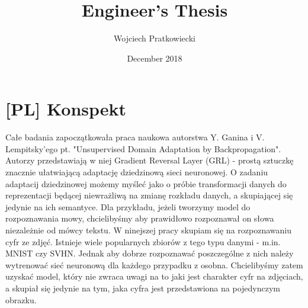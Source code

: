 \documentclass{article}
\title{Engineer's Thesis}
\author{Wojciech Pratkowiecki}
\date{December 2018}
\begin{document}
\maketitle

\section{[PL] Konspekt}
\par
Całe badania zapoczątkowała praca naukowa autorstwa Y. Ganina i V. Lempitsky'ego pt. "Unsupervised Domain Adaptation by Backpropagation". Autorzy przedstawiają w niej Gradient Reversal Layer (GRL) - prostą sztuczkę znacznie ułatwiającą adaptację dziedzinową sieci neuronowej. O zadaniu adaptacij dziedzinowej możemy myśleć jako o próbie transformacji danych do reprezentacji będącej niewrażliwą na zmianę rozkładu danych, a skupiającej się jedynie na ich semantyce. Dla przykładu, jeżeli tworzymy model do rozpoznawania mowy, chcielibyśmy aby prawidłowo rozpoznawał on słowa niezależnie od mówcy tekstu. W ninejszej pracy skupiam się na rozpoznawaniu cyfr ze zdjęć. Istnieje wiele popularnych zbiorów z tego typu danymi - m.in. MNIST czy SVHN. Jednak aby dobrze rozpoznawać poszczególne z nich należy wytrenować sieć neuronową dla każdego przypadku z osobna. Chcielibyśmy zatem uzyskać model, który nie zwraca uwagi na to jaki jest charakter cyfr na zdjęciach, a skupiał się jedynie na tym, jaka cyfra jest przedstawiona na pojedynczym obrazku. 
\par
\end{document}
